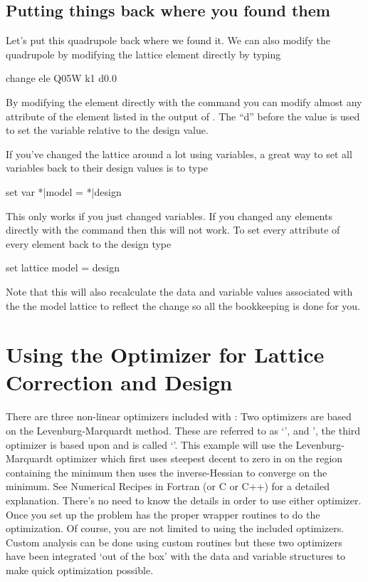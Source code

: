 \subsection{Putting things back where you found them}
\label{ss:put_it_back}

Let's put this quadrupole back where we found it. We can also modify
the quadrupole by modifying the lattice element directly by typing
\begin{example}
  change ele Q05W k1 d0.0
\end{example}
By modifying the element directly with the  command
you can modify almost any attribute of the element listed in the
output of .  The ``d'' before the value is used to
set the variable relative to the design value.

If you've changed the lattice around a lot using variables, a great
way to set all variables back to their design values is to type
\begin{example}
  set var *|model = *|design
\end{example}
This only works if you just changed variables. If you changed any
elements directly with the  command then this will not
work. To set every attribute of every element back to the design type
\begin{example}
  set lattice model = design
\end{example}
Note that this will also recalculate the data and variable values
associated with the the model lattice to reflect the change so all the
bookkeeping is done for you.


\section{Using the Optimizer for Lattice Correction and Design}
\label{s:optimizer}

There are three non-linear optimizers included with \tao: Two
optimizers are based on the Levenburg-Marquardt method. These are
referred to as `', and ', the third optimizer is
based upon  and is called `'. This example
will use the Levenburg-Marquardt optimizer which first uses steepest
decent to zero in on the region containing the minimum then uses the
inverse-Hessian to converge on the minimum. See Numerical Recipes in
Fortran (or C or C++) for a detailed explanation. There's no need to
know the details in order to use either optimizer. Once you set up the
problem \tao has the proper wrapper routines to do the
optimization. Of course, you are not limited to using the included
optimizers. Custom analysis can be done using custom routines but
these two optimizers have been integrated `out of the box' with the
\tao data and variable structures to make quick optimization possible.

